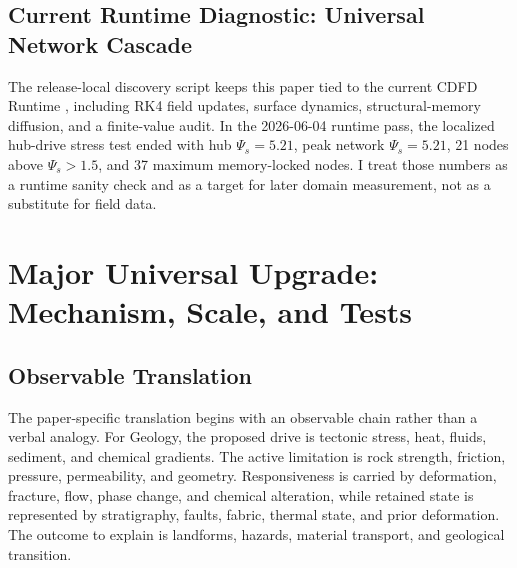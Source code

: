 \documentclass[11pt]{article}
\begin{document}
\subsection{Current Runtime Diagnostic: Universal Network Cascade}
The release-local discovery script keeps this paper tied to the current CDFD Runtime \cite{CDFDRuntime2026}, including RK4 field updates, surface dynamics, structural-memory diffusion, and a finite-value audit. In the 2026-06-04 runtime pass, the localized hub-drive stress test ended with hub $\Psi_s=5.21$, peak network $\Psi_s=5.21$, 21 nodes above $\Psi_s>1.5$, and 37 maximum memory-locked nodes. I treat those numbers as a runtime sanity check and as a target for later domain measurement, not as a substitute for field data.


\section{Major Universal Upgrade: Mechanism, Scale, and Tests}

\subsection{Observable Translation}

The paper-specific translation begins with an observable chain rather than a
verbal analogy. For Geology, the proposed drive is tectonic stress, heat, fluids, sediment, and chemical gradients.
The active limitation is rock strength, friction, pressure, permeability, and geometry. Responsiveness is carried by
deformation, fracture, flow, phase change, and chemical alteration, while retained state is represented by
stratigraphy, faults, fabric, thermal state, and prior deformation. The outcome to explain is landforms, hazards, material transport, and geological transition.
\end{document}
